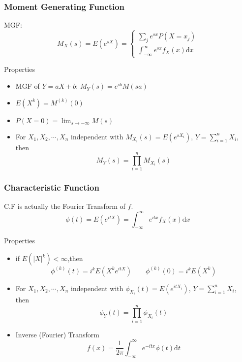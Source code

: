 \subsubsection{Moment Generating Function}
    MGF: 
    \begin{equation}
        M_X(s)=E(e^{sX})=\begin{cases}
            \sum_je^{sx}P(X=x_j)\\
            \int_{-\infty}^\infty e^{sx}f_X(x)\mathrm{d}x
        \end{cases}
    \end{equation}

    Properties
    \begin{itemize}
        \item MGF of $Y=aX+b$: $
            M_Y(s)=e^{sb}M(sa)    $
        \item $E(X^k)=M^{(k)}(0)$
        \item $P(X=0)={\displaystyle\lim_{s\to -\infty}}M(s)$
        \item For $X_1,X_2,\cdots,X_n$ independent with $M_{X_i}(s)=E(e^{sX_i})$, $Y={\displaystyle \sum_{i=1}^n} X_i$, then
        \begin{equation}    
            M_Y(s)=\prod_{i=1}^n M_{X_i}(s)
        \end{equation}
    \end{itemize}
\subsubsection{Characteristic Function}
    C.F is actually the Fourier Transform of $f$.
    \begin{equation}
        \phi(t)=E(e^{itX}) = \int_{-\infty}^\infty e^{itx}f_X(x)\mathrm{d}x
    \end{equation}

    Properties
    \begin{itemize}
    \item if $E(|X|^k)<\infty$,then
    \begin{equation}
        \phi^{(k)}(t)=i^kE(X^ke^{itX})\qquad \phi^{(k)}(0)=i^kE(X^k)    
    \end{equation}
    \item For $X_1,X_2,\cdots,X_n$ independent with $\phi_{X_i}(t)=E(e^{itX_i})$, $Y={\displaystyle \sum_{i=1}^n} X_i$, then
    \begin{equation}
        \phi_Y(t)=\prod_{i=1}^n \phi_{X_i}(t)
    \end{equation}
    \item Inverse (Fourier) Transform
    \begin{equation}
        f(x)=\frac{1}{2\pi}\int_{-\infty}^\infty e^{-itx}\phi(t)\mathrm{d}t    
    \end{equation}
\end{itemize}



